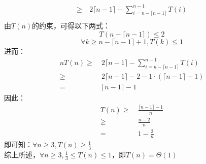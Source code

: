\begin{solution}
\begin{align*}
        \ge&~ 2 \lceil n - 1 \rceil - \sum_{i = n - \lceil n - 1 \rceil}^{n - 1} T(i)\\
    \end{align*}
    由$T(n)$的约束，可得以下两式：
    $$T(n-\lceil n - 1 \rceil) \le 2$$
    $$\forall k \ge n-\lceil n - 1 \rceil+1, T(k) \le 1$$
    进而：
    \begin{align*}
        nT(n) \ge&~ 2 \lceil n - 1 \rceil - \sum_{i = n - \lceil n - 1 \rceil}^{n - 1} T(i)\\
        \ge&~ 2 \lceil n - 1 \rceil - 2 - 1 \cdot (\lceil n - 1 \rceil - 1)\\
        =&~ \lceil n - 1 \rceil - 1
    \end{align*}
    因此：
    \begin{align*}
        T(n) \ge&~ \frac{\lceil n - 1 \rceil - 1}{n}\\
        \ge&~ \frac{n - 2}{n}\\
        =&~ 1-\frac{2}{n}
    \end{align*}
    即可知：$\forall n \ge 3,T(n) \ge \frac{1}{3}$\\
    综上所述，$\forall n \ge 3, \frac{1}{3} \le T(n) \le 1$，即$T(n)=\Theta(1)$
\end{solution}